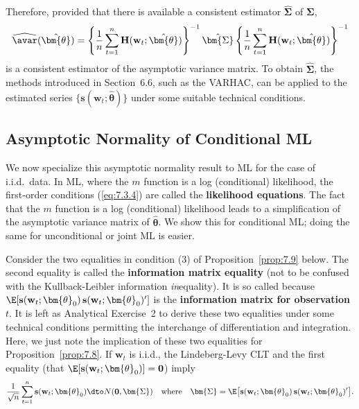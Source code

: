 Therefore, provided that there is available a consistent estimator $\hat{\bm{\Sigma}}$ of $\bm{\Sigma}$,
\begin{equation}
\label{eq:7.3.11}
\widehat{\avar}(\hat{\bm{\theta}}) = \left\{ \frac{1}{n}\sum_{t=1}^{n}\mathbf{H}(\mathbf{w}_t; \hat{\bm{\theta}}) \right\}^{-1} \hat{\bm{\Sigma}} \left\{ \frac{1}{n}\sum_{t=1}^{n}\mathbf{H}(\mathbf{w}_t; \hat{\bm{\theta}}) \right\}^{-1}
\end{equation}
is a consistent estimator of the asymptotic variance matrix. To obtain $\hat{\bm{\Sigma}}$, the methods introduced in Section~6.6, such as the VARHAC, can be applied to the estimated series $\{\mathbf{s}(\mathbf{w}_t; \hat{\bm{\theta}})\}$ under some suitable technical conditions.

\subsection*{Asymptotic Normality of Conditional ML}

We now specialize this asymptotic normality result to ML for the case of i.i.d.\ data. In ML, where the $m$ function is a log (conditional) likelihood, the first-order conditions (\ref{eq:7.3.4}) are called the \textbf{likelihood equations}. The fact that the $m$ function is a log (conditional) likelihood leads to a simplification of the asymptotic variance matrix of $\hat{\bm{\theta}}$. We show this for conditional ML; doing the same for unconditional or joint ML is easier.

Consider the two equalities in condition (3) of Proposition~\ref{prop:7.9} below. The second equality is called the \textbf{information matrix equality} (not to be confused with the Kullback-Leibler information \emph{in}equality). It is so called because $\E[\mathbf{s}(\mathbf{w}_t; \bm{\theta}_0)\,\mathbf{s}(\mathbf{w}_t; \bm{\theta}_0)']$ is the \textbf{information matrix for observation} $t$. It is left as Analytical Exercise~2 to derive these two equalities under some technical conditions permitting the interchange of differentiation and integration. Here, we just note the implication of these two equalities for Proposition~\ref{prop:7.8}. If $\mathbf{w}_t$ is i.i.d., the Lindeberg-Levy CLT and the first equality (that $\E[\mathbf{s}(\mathbf{w}_t; \bm{\theta}_0)] = \mathbf{0}$) imply
\begin{equation}
\label{eq:7.3.12}
\frac{1}{\sqrt{n}} \sum_{t=1}^{n} \mathbf{s}(\mathbf{w}_t; \bm{\theta}_0) \dto N(\mathbf{0}, \bm{\Sigma}) \quad \text{where} \quad \bm{\Sigma} = \E\bigl[\mathbf{s}(\mathbf{w}_t; \bm{\theta}_0)\,\mathbf{s}(\mathbf{w}_t; \bm{\theta}_0)'\bigr].
\end{equation}

